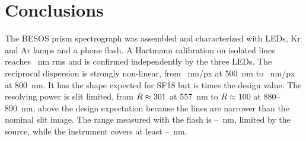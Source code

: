 \section{Conclusions}
\label{sec:concl}

The BESOS prism spectrograph was assembled and characterized with LEDs, Kr and Ar lamps and a phone flash. A Hartmann calibration on \CalN{} isolated lines reaches \CalRMS~nm rms and is confirmed independently by the three LEDs. The reciprocal dispersion is strongly non-linear, from \DispMeasFiveH~nm/px at 500~nm to \DispMeasEightH~nm/px at 800~nm. It has the shape expected for SF18 but is \DispRatio{} times the design value. The resolving power is slit limited, from $R\approx301$ at 557~nm to $R\approx100$ at 880--890~nm, above the design expectation because the lines are narrower than the nominal slit image. The range measured with the flash is \RangeMin--\RangeMax~nm, limited by the source, while the instrument covers at least \RangeDetMin--\RangeLastLine~nm.